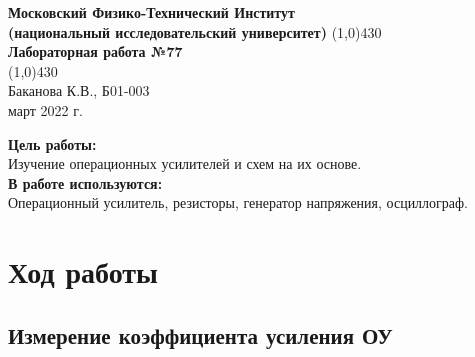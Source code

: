 \documentclass[a4paper, 12pt]{article}%
\begin{document}
\begin{titlepage}

\begin{center}
\large\textbf{Московский Физико-Технический Институт}\\
\large\textbf{(национальный исследовательский университет)}
\vfill
\line(1,0){430}\\[3mm]
\huge\textbf{Лабораторная работа №77}\\
\line(1,0){430}\\[1mm]
\vfill
\large Баканова К.В., Б01-003\\
\large март 2022 г.\\
\end{center}

\end{titlepage}
\noindent \textbf{Цель работы:} \\
\indent Изучение операционных усилителей и схем на их основе.\\
\noindent \textbf{В работе используются:} \\
\indent Операционный усилитель, резисторы, генератор напряжения, осциллограф.

\section{Ход работы}

\subsection{Измерение коэффициента усиления ОУ}
\end{document}
